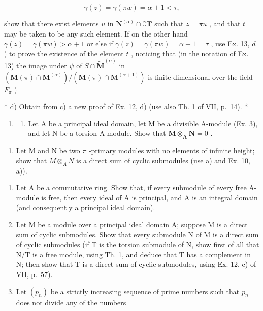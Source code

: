 \[
\gamma (z) = \gamma (\pi w) = \alpha + 1 <   \tau ,
\]

show that there exist elements \(u\) in \(\mathbf{N}^{(\alpha)} \cap \complement \mathbf{T}\) such that \(z = \pi u\) , and that \(t\) may be taken to be any such element. If on the other hand \(\gamma(z) = \gamma(\pi w) > \alpha + 1\) or else if \(\gamma(z) = \gamma(\pi w) = \alpha + 1 = \tau\) , use Ex. 13, \(d\) ) to prove the existence of the element \(t\) , noticing that (in the notation of Ex. 13) the image under \(\psi\) of \(S \cap \tilde{\mathbf{M}}^{(\alpha)}\) in \((\mathbf{M}(\pi) \cap \mathbf{M}^{(\alpha)}) / (\mathbf{M}(\pi) \cap \mathbf{M}^{(\alpha + 1)})\) is finite dimensional over the field \(F_{\pi}\) )

* d) Obtain from c) a new proof of Ex. 12, d) (use also Th. 1 of VII, p.~14). *

\begin{enumerate}
\def\labelenumi{\arabic{enumi})}
\setcounter{enumi}{14}
\tightlist
\item
  \begin{enumerate}
  \def\labelenumii{\alph{enumii})}
  \tightlist
  \item
    Let A be a principal ideal domain, let M be a divisible A-module (Ex. 3), and let N be a torsion A-module. Show that \(\mathbf{M} \otimes_{\mathbf{A}} \mathbf{N} = 0\) .
  \end{enumerate}
\end{enumerate}

\begin{enumerate}
\def\labelenumi{\alph{enumi})}
\setcounter{enumi}{1}
\tightlist
\item
  Let M and N be two \(\pi\) -primary modules with no elements of infinite height; show that \(M \otimes_{A} N\) is a direct sum of cyclic submodules (use a) and Ex. 10, a)).
\end{enumerate}

\BourbakiExerciseGroup

\begin{enumerate}
\def\labelenumi{\arabic{enumi})}
\item
  Let A be a commutative ring. Show that, if every submodule of every free A-module is free, then every ideal of A is principal, and A is an integral domain (and consequently a principal ideal domain).
\item
  Let M be a module over a principal ideal domain A; suppose M is a direct sum of cyclic submodules. Show that every submodule N of M is a direct sum of cyclic submodules (if T is the torsion submodule of N, show first of all that N/T is a free module, using Th. 1, and deduce that T has a complement in N; then show that T is a direct sum of cyclic submodules, using Ex. 12, c) of VII, p.~57).
\item
  Let \((p_n)\) be a strictly increasing sequence of prime numbers such that \(p_n\) does not divide any of the numbers
\end{enumerate}

